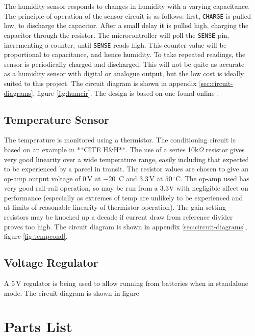 \documentclass[a4paper,11pt]{article}  %
\providecommand{\degrees}{\ensuremath{^{\circ}}}
\begin{document}
The humidity sensor responds to changes in humidity with a varying
capacitance. The principle of operation of the sensor circuit is as
follows: first, \texttt{CHARGE} is pulled low, to discharge the
capacitor. After a small delay it is pulled high, charging the
capacitor through the resistor. The microcontroller will poll the
\texttt{SENSE} pin, incrementing a counter, until \texttt{SENSE} reads
high. This counter value will be proportional to capacitance, and
hence humidity. To take repeated readings, the sensor is periodically
charged and discharged. This will not be quite as accurate as a
humidity sensor with digital or analogue output, but the low cost is
ideally suited to this project. The circuit diagram is shown in
appendix \ref{sec:circuit-diagrams}, figure \ref{fig:humcir}. The
design is based on one found online \cite{hum_sens}.

\subsection{Temperature Sensor}

The temperature is monitored using a thermistor. The conditioning
circuit is based on an example in **CITE H\&H**. The use of a series
10k$\Omega$ resistor gives very good linearity over a wide temperature
range, easily including that expected to be experienced by a parcel in
transit. The resistor values are chosen to give an op-amp output
voltage of $0\,\mathrm{V}$ at $-20\,\mathrm{\degrees C}$ and
$3.3\,\mathrm{V}$ at $50\,\mathrm{\degrees C}$. The op-amp used has
very good rail-rail operation, so may be run from a 3.3V with
negligible affect on performance (especially as extremes of temp are
unlikely to be experienced and at limits of reasonable linearity of
thermistor operation). The gain setting resistors may be knocked up a
decade if current draw from reference divider proves too high. The
circuit diagram is shown in appendix \ref{sec:circuit-diagrams},
figure \ref{fig:tempcond}.

\subsection{Voltage Regulator}

A $5\,\mathrm{V}$ regulator is being used to allow running from
batteries when in standalone mode. The circuit diagram is shown in
figure 

\section{Parts List}
\label{sec:parts-list}
\end{document}
